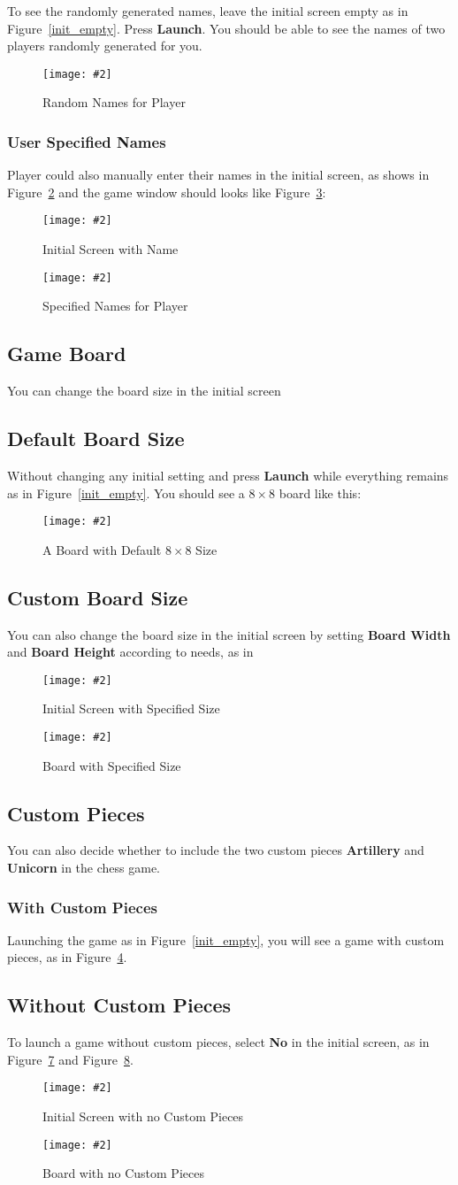 \documentclass[12pt]{article}
\newcommand{\img}[3]{
\begin{figure}[!ht]
\begin{center}
\texttt{[image: \#2]}
\caption{#3}\label{#2}
\end{center}
\end{figure}
}
\newcommand{\B}[1]{\textbf{#1}}
\begin{document}
To see the randomly generated names, leave the initial screen empty as in Figure~\ref{init_empty}. Press \B{Launch}. You should be able to see the names of two players randomly generated for you.
\img{0.5}{random_name}{Random Names for Player}

\subsubsection{User Specified Names}
Player could also manually enter their names in the initial screen, as shows in Figure~\ref{init_names} and the game window should looks like Figure~\ref{specified_name}:
\img{0.7}{init_names}{Initial Screen with Name}
\img{0.5}{specified_name}{Specified Names for Player}

\subsection{Game Board}
You can change the board size in the initial screen

\subsection{Default Board Size}
Without changing any initial setting and press \B{Launch} while everything remains as in Figure~\ref{init_empty}. You should see a $8\times8$ board like this:
\img{0.5}{board_default_size}{A Board with Default $8\times8$ Size}

\subsection{Custom Board Size}
You can also change the board size in the initial screen by setting \B{Board Width} and \B{Board Height} according to needs, as in
\img{0.7}{init_board_size}{Initial Screen with Specified Size}
\img{0.5}{board_specified_size}{Board with Specified Size}

\subsection{Custom Pieces}
You can also decide whether to include the two custom pieces \B{Artillery} and \B{Unicorn} in the chess game.

\subsubsection{With Custom Pieces}
Launching the game as in Figure~\ref{init_empty}, you will see a game with custom pieces, as in Figure~\ref{board_default_size}.

\subsection{Without Custom Pieces}
To launch a game without custom pieces, select \B{No} in the initial screen, as in Figure~\ref{init_no_custom} and Figure~\ref{board_no_custom}.
\img{0.7}{init_no_custom}{Initial Screen with no Custom Pieces}
\img{0.5}{board_no_custom}{Board with no Custom Pieces}


\end{document}
